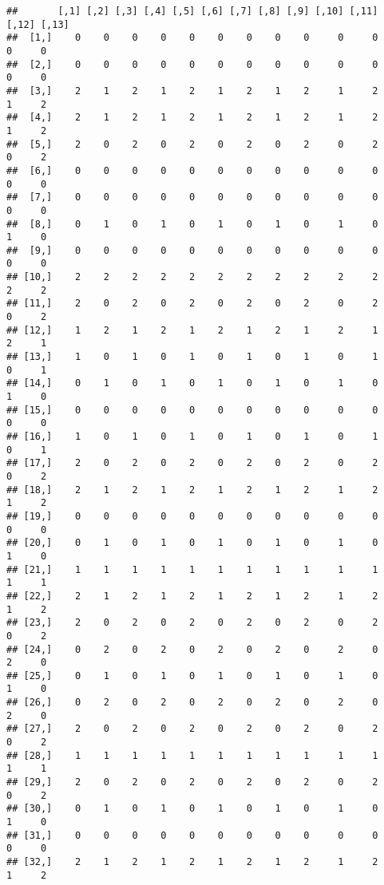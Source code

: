 \documentclass[
]{article}
\begin{document}
\begin{verbatim}
##       [,1] [,2] [,3] [,4] [,5] [,6] [,7] [,8] [,9] [,10] [,11] [,12] [,13]
##  [1,]    0    0    0    0    0    0    0    0    0     0     0     0     0
##  [2,]    0    0    0    0    0    0    0    0    0     0     0     0     0
##  [3,]    2    1    2    1    2    1    2    1    2     1     2     1     2
##  [4,]    2    1    2    1    2    1    2    1    2     1     2     1     2
##  [5,]    2    0    2    0    2    0    2    0    2     0     2     0     2
##  [6,]    0    0    0    0    0    0    0    0    0     0     0     0     0
##  [7,]    0    0    0    0    0    0    0    0    0     0     0     0     0
##  [8,]    0    1    0    1    0    1    0    1    0     1     0     1     0
##  [9,]    0    0    0    0    0    0    0    0    0     0     0     0     0
## [10,]    2    2    2    2    2    2    2    2    2     2     2     2     2
## [11,]    2    0    2    0    2    0    2    0    2     0     2     0     2
## [12,]    1    2    1    2    1    2    1    2    1     2     1     2     1
## [13,]    1    0    1    0    1    0    1    0    1     0     1     0     1
## [14,]    0    1    0    1    0    1    0    1    0     1     0     1     0
## [15,]    0    0    0    0    0    0    0    0    0     0     0     0     0
## [16,]    1    0    1    0    1    0    1    0    1     0     1     0     1
## [17,]    2    0    2    0    2    0    2    0    2     0     2     0     2
## [18,]    2    1    2    1    2    1    2    1    2     1     2     1     2
## [19,]    0    0    0    0    0    0    0    0    0     0     0     0     0
## [20,]    0    1    0    1    0    1    0    1    0     1     0     1     0
## [21,]    1    1    1    1    1    1    1    1    1     1     1     1     1
## [22,]    2    1    2    1    2    1    2    1    2     1     2     1     2
## [23,]    2    0    2    0    2    0    2    0    2     0     2     0     2
## [24,]    0    2    0    2    0    2    0    2    0     2     0     2     0
## [25,]    0    1    0    1    0    1    0    1    0     1     0     1     0
## [26,]    0    2    0    2    0    2    0    2    0     2     0     2     0
## [27,]    2    0    2    0    2    0    2    0    2     0     2     0     2
## [28,]    1    1    1    1    1    1    1    1    1     1     1     1     1
## [29,]    2    0    2    0    2    0    2    0    2     0     2     0     2
## [30,]    0    1    0    1    0    1    0    1    0     1     0     1     0
## [31,]    0    0    0    0    0    0    0    0    0     0     0     0     0
## [32,]    2    1    2    1    2    1    2    1    2     1     2     1     2

\end{verbatim}
\end{document}
